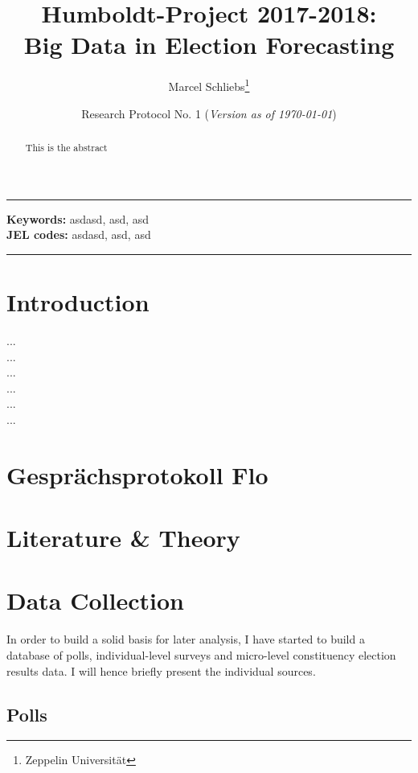\documentclass[14pt, a4paper]{article}
\title{Humboldt-Project 2017-2018:\\ Big Data in Election Forecasting}
\author{Marcel Schliebs\thanks{Zeppelin Universität}\footnotemark[2]}
\date{Research Protocol No. 1 (\textit{Version as of \today})}
\begin{document}
\maketitle

\rule{\linewidth}{0.4pt}
\begin{abstract}
This is the abstract
\end{abstract}
\textbf{Keywords:} asdasd, asd, asd\\
\medskip
\textbf{JEL codes:} asdasd, asd, asd\\
\rule{\linewidth}{0.4pt}


\maketitle

\tableofcontents
\newpage


\section{Introduction}

...\\
...\\
...\\
...\\
...\\
...\\

\section{Gesprächsprotokoll Flo}



\section{Literature \& Theory}

\section{Data Collection}

In order to build a solid basis for later analysis, I have started to build a database of polls, individual-level surveys and micro-level constituency election results data. 
I will hence briefly present the individual sources. 

\subsection{Polls}
\end{document}
